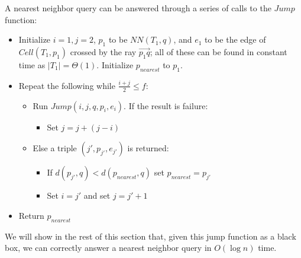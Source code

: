 \documentclass[12pt,a4paper,USenglish,cleveref, autoref, thm-restate]{article}
\newcommand{\ovar}[1]{\overrightarrow{#1}}
\newcommand{\Cell}{\mathit{Cell}}
\newcommand{\NN}{\mathit{NN}}
\newcommand{\nearest}{\mathit{nearest}}
\newcommand{\john}[1]{\textcolor{red}{#1}}
\newcommand{\yakov}[1]{\textcolor{blue}{Yakov: #1}}
\newcommand{\ovar}[1]{\overrightarrow{#1}}
\newcommand{\Cell}{\mathit{Cell}}
\newcommand{\NN}{\mathit{NN}}
\newcommand{\nearest}{\mathit{nearest}}
\newcommand{\john}[1]{\textcolor{red}{#1}}
\newcommand{\yakov}[1]{\textcolor{blue}{Yakov: #1}}
\newcommand{\ovar}[1]{\overrightarrow{#1}}
\newcommand{\Cell}{\mathit{Cell}}
\newcommand{\NN}{\mathit{NN}}
\newcommand{\nearest}{\mathit{nearest}}
\newcommand{\john}[1]{\textcolor{red}{#1}}
\newcommand{\yakov}[1]{\textcolor{blue}{Yakov: #1}}
\begin{document}
A nearest neighbor query can be answered through a series of calls to the $Jump$ function: 
\begin{itemize}
 \setlength{\itemsep}{1pt}
\setlength{\parskip}{0pt}
\setlength{\parsep}{0pt}    
 \item Initialize $i=1, j=2$, $p_1$ to be $\NN(T_1,q)$, and $e_1$ to be the edge of $\Cell(T_1,p_1)$ crossed by the ray $\ovar{p_1q}$; all of these can be found in constant time as $|T_1|=\Theta(1)$. Initialize $p_{\nearest}$ to $p_1$. 




 
 \item  Repeat the following while $\frac{i+j}{2} \leq  f$:
\begin{itemize}
 \setlength{\itemsep}{1pt}
\setlength{\parskip}{0pt}
\setlength{\parsep}{0pt}    
    \item Run $Jump(i,j,q,p_i,e_i)$. If the result is failure: 
 \begin{itemize}
  \setlength{\itemsep}{1pt}
\setlength{\parskip}{0pt}
\setlength{\parsep}{0pt} 
\item Set $j=j+(j-i)$
 \end{itemize}
   \item Else a triple $(j',p_{j'},e_{j'})$ is returned: 
\begin{itemize}
     \setlength{\itemsep}{1pt}
\setlength{\parskip}{0pt}
\setlength{\parsep}{0pt} 
            \item If $d(p_{j'},q) < d(p_{\nearest},q)$ set $p_{\nearest}=p_{j'}$
            \item Set $i=j'$ and
            set $j=j'+1$
\end{itemize}

\end{itemize}
\item Return $p_{\nearest}$
\end{itemize}
We will show in the rest of this section that, given this jump function as a black box, we can correctly answer a nearest neighbor query in $O(\log n)$ time. 
\end{document}
